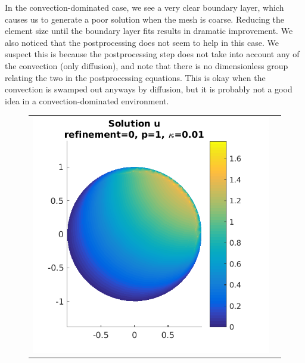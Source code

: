 \documentclass{article}
\begin{document}
In the convection-dominated case, we see a very clear boundary layer, which causes us to generate a poor solution when the mesh is coarse.
Reducing the element size until the boundary layer fits results in dramatic improvement.
We also noticed that the postprocessing does not seem to help in this case.
We suspect this is because the postprocessing step does not take into account any of the convection (only diffusion), and note that there is no dimensionless group relating the two in the postprocessing equations.
This is okay when the convection is swamped out anyways by diffusion, but it is probably not a good idea in a convection-dominated environment.

\begin{figure}[!ht]
\centering
\begin{tabular}{c c}
\includegraphics[scale=0.7]{umu_113.png} & 

\end{tabular}
\end{figure}
\end{document}
